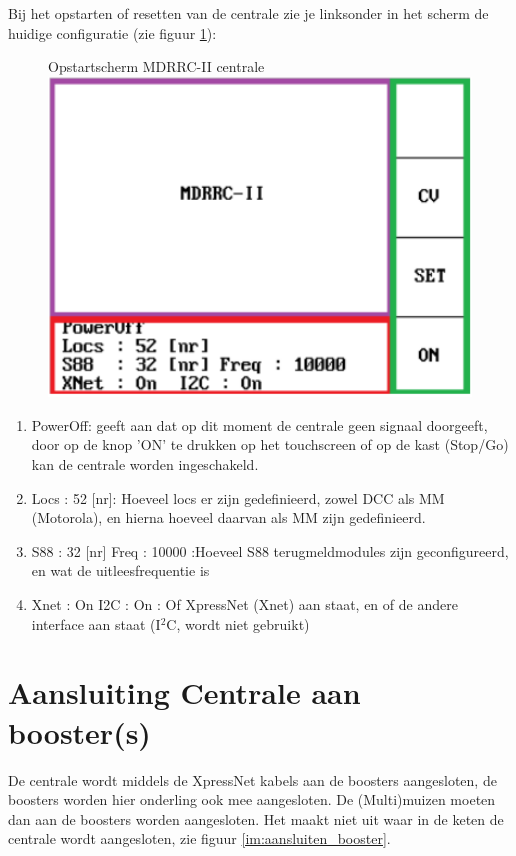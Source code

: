 \documentclass[12pt,a4paper]{report}
\newcommand*{\isqc}{I$^{2}$C}
\begin{document}
Bij het opstarten of resetten van de centrale zie je linksonder in het scherm de huidige configuratie (zie figuur \ref{rcu-foto4}):

\begin{figure}[h]
  \captionbox
  {Opstartscherm MDRRC-II centrale\label{rcu-foto4}}
  {\includegraphics[scale=0.6]{images/rcu_foto4}}\\
\end{figure}

\begin{enumerate}
\item PowerOff: geeft aan dat op dit moment de centrale geen signaal doorgeeft, door op de knop 'ON' te drukken op het touchscreen of op de kast (Stop/Go) kan de centrale worden ingeschakeld.
\item Locs : 52 [nr]: Hoeveel locs er zijn gedefinieerd, zowel DCC als MM (Motorola), en hierna hoeveel daarvan als MM zijn gedefinieerd.
\item S88  : 32 [nr] Freq : 10000 :Hoeveel S88 terugmeldmodules zijn geconfigureerd, en wat de uitleesfrequentie is
\item Xnet : On  I2C : On : Of XpressNet (Xnet) aan staat, en of de andere interface aan staat (\isqc, wordt niet gebruikt)
\end{enumerate}

\section{Aansluiting Centrale aan booster(s)}
De centrale wordt middels de XpressNet kabels aan de boosters aangesloten, de boosters worden hier onderling ook mee aangesloten. De (Multi)muizen moeten dan aan de boosters worden aangesloten. Het maakt niet uit waar in de keten de centrale wordt aangesloten, zie figuur \ref{im:aansluiten_booster}.
\end{document}
